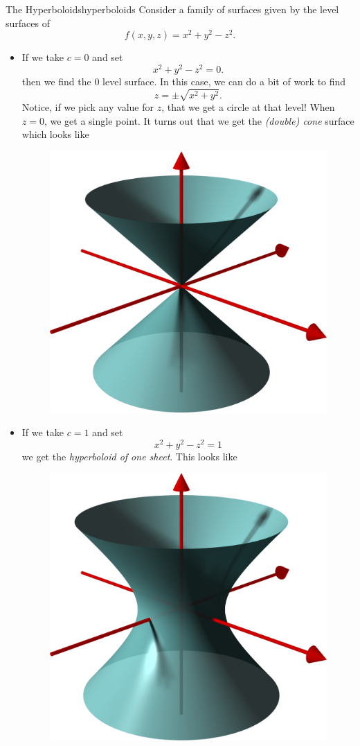         \begin{ex}{The Hyperboloids}{hyperboloids}
        Consider a family of surfaces given by the level surfaces of
        \[
        f(x,y,z)=x^2+y^2-z^2.
        \]
        \begin{itemize}
            \item If we take $c=0$ and set
            \[
            x^2+y^2-z^2=0.
            \]
            then we find the 0 level surface. In this case, we can do a bit of work to find
            \[
            z=\pm \sqrt{x^2+y^2}.
            \]
            Notice, if we pick any value for $z$, that we get a circle at that level!  When $z=0$, we get a single point.  It turns out that we get the \emph{(double) cone} surface which looks like
            \begin{figure}[H]
                \centering
             \includegraphics[width=.4\textwidth]{Figures/cone_surface.png}
            \end{figure}
            
            \item If we take $c=1$ and set
            \[
            x^2+y^2-z^2=1
            \]
            we get the \emph{hyperboloid of one sheet}.  This looks like
            \begin{figure}[H]
                \centering
                \includegraphics[width=.4\textwidth]{Figures/hyperboloid_1_sheet.png}
            \end{figure}
            

\end{itemize}
\end{ex}
